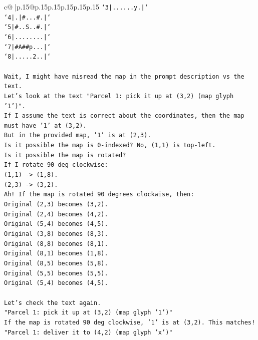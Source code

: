 \documentclass{article}
\begin{document}
{\begin{supertabular}{c@{$\;$}|p{.15\linewidth}@{}p{.15\linewidth}p{.15\linewidth}p{.15\linewidth}p{.15\linewidth}p{.15\linewidth}}
{{{\texttt{`3|......y.|`} \\
\texttt{`4|.|\#...\#.|`} \\
\texttt{`5|\#..S..\#.|`} \\
\texttt{`6|........|`} \\
\texttt{`7|\#A\#\#p...|`} \\
\texttt{`8|.....2..|`} \\
\\ 
\texttt{Wait, I might have misread the map in the prompt description vs the text.} \\
\texttt{Let's look at the text "Parcel 1: pick it up at (3,2) (map glyph '1')".} \\
\texttt{If I assume the text is correct about the coordinates, then the map must have '1' at (3,2).} \\
\texttt{But in the provided map, '1' is at (2,3).} \\
\texttt{Is it possible the map is 0{-}indexed? No, (1,1) is top{-}left.} \\
\texttt{Is it possible the map is rotated?} \\
\texttt{If I rotate 90 deg clockwise:} \\
\texttt{(1,1) {-}> (1,8).} \\
\texttt{(2,3) {-}> (3,2).} \\
\texttt{Ah! If the map is rotated 90 degrees clockwise, then:} \\
\texttt{Original (2,3) becomes (3,2).} \\
\texttt{Original (2,4) becomes (4,2).} \\
\texttt{Original (5,4) becomes (4,5).} \\
\texttt{Original (3,8) becomes (8,3).} \\
\texttt{Original (8,8) becomes (8,1).} \\
\texttt{Original (8,1) becomes (1,8).} \\
\texttt{Original (8,5) becomes (5,8).} \\
\texttt{Original (5,5) becomes (5,5).} \\
\texttt{Original (5,4) becomes (4,5).} \\
\\ 
\texttt{Let's check the text again.} \\
\texttt{"Parcel 1: pick it up at (3,2) (map glyph '1')"} \\
\texttt{If the map is rotated 90 deg clockwise, '1' is at (3,2). This matches!} \\
\texttt{"Parcel 1: deliver it to (4,2) (map glyph 'x')"} \\
}}}
\end{supertabular}}
\end{document}
